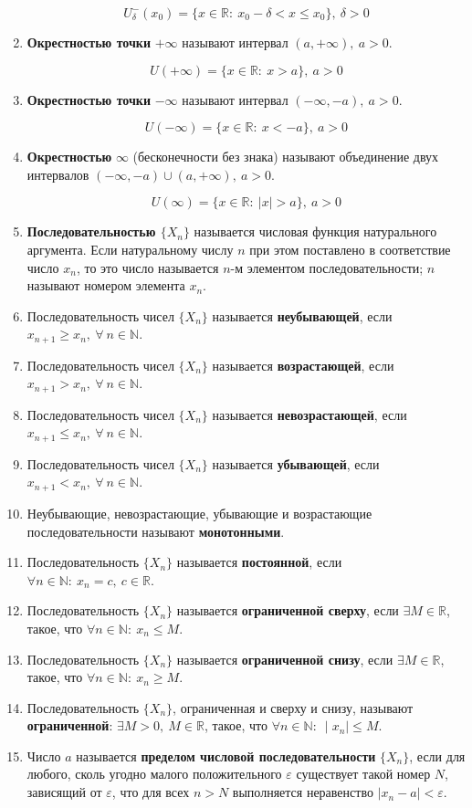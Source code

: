 \begin{enumerate}
$$U^-_{\delta}(x_0) = \{x \in \mathbb{R}: \ x_0 -\delta < x \leqslant x_0\},\ \delta > 0
    $$
\item \textbf{Окрестностью точки} $+\infty$ называют интервал $(a, +\infty), \ a > 0$.

$$U(+\infty) = \{x \in \mathbb{R}: \ x > a\}, \ a > 0
    $$
\item \textbf{Окрестностью точки} $-\infty$ называют интервал $(-\infty, -a), \ a > 0$.

$$U(-\infty) = \{x \in \mathbb{R}: \ x < -a\}, \ a > 0
    $$
\item \textbf{Окрестностью} $\infty$ (бесконечности без знака) называют объединение двух интервалов $(-\infty, -a) \cup (a, +\infty),\ a > 0$.

$$U(\infty) = \{x \in \mathbb{R}: \ | x | > a\}, \ a > 0
    $$
\item \textbf{Последовательностью $\{X_n\}$} называется числовая функция натурального аргумента. Если натуральному числу $n$ при этом поставлено в соответствие число $x_n$, то это число называется $n$-м элементом последовательности; $n$ называют номером элемента $x_n$.
\item Последовательность чисел $\{X_n\}$ называется \textbf{неубывающей}, если $x_{n+1}\geqslant x_n, \ \forall\ n \in \mathbb{N}$.
\item Последовательность чисел $\{X_n\}$ называется \textbf{возрастающей}, если $x_{n+1} > x_n, \ \forall\ n \in \mathbb{N}$.
\item Последовательность чисел $\{X_n\}$ называется \textbf{невозрастающей}, если $x_{n+1} \leqslant x_n, \ \forall\ n \in \mathbb{N}$.
\item Последовательность чисел $\{X_n\}$ называется \textbf{убывающей}, если $x_{n+1} < x_n, \ \forall\ n \in \mathbb{N}$.
\item Неубывающие, невозрастающие, убывающие и возрастающие последовательности называют \textbf{монотонными}.
\item Последовательность $\{X_n\}$ называется \textbf{постоянной}, если $ \forall n \in \mathbb{N}: \ x_n = c, \ c \in \mathbb{R}$.
\item Последовательность $\{X_n\}$ называется \textbf{ограниченной сверху}, если $\exists M \in \mathbb{R}$, такое, что $\forall n \in \mathbb{N}: \ x_n \leqslant M$.
\item Последовательность $\{X_n\}$ называется \textbf{ограниченной снизу}, если $\exists M \in \mathbb{R}$, такое, что $\forall n \in \mathbb{N}: \ x_n \geqslant M$.
\item Последовательность $\{X_n\}$, ограниченная и сверху и снизу, называют \textbf{ограниченной}: $\exists M > 0, \ M \in \mathbb{R}$, такое, что $\forall n \in \mathbb{N}: \ \mid  x_n\mid   \leqslant M$.
\item Число $a$ называется \textbf{пределом числовой последовательности} $\{X_n\}$, если для любого, сколь угодно малого положительного ${\varepsilon}$ существует такой номер $N$, зависящий от ${\varepsilon}$, что для всех $n > N$ выполняется неравенство $\mid x_n - a\mid   < {\varepsilon}$.


\end{enumerate}

